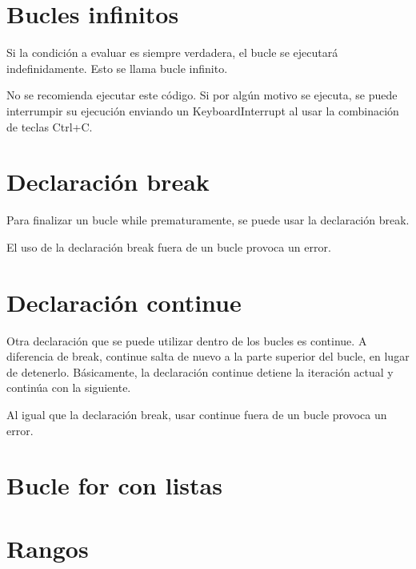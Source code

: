 \documentclass{report}
\begin{document}

\section{Bucles infinitos}

Si la condición a evaluar es siempre verdadera, el bucle se ejecutará indefinidamente. Esto se llama bucle infinito.


No se recomienda ejecutar este código. Si por algún motivo se ejecuta, se puede interrumpir su ejecución enviando un KeyboardInterrupt al usar la combinación de teclas Ctrl+C.

\section{Declaración break}

Para finalizar un bucle while prematuramente, se puede usar la declaración break.


El uso de la declaración break fuera de un bucle provoca un error.


\section{Declaración continue}

Otra declaración que se puede utilizar dentro de los bucles es continue. A diferencia de break, continue salta de nuevo a la parte superior del bucle, en lugar de detenerlo. Básicamente, la declaración continue detiene la iteración actual y continúa con la siguiente.


Al igual que la declaración break, usar continue fuera de un bucle provoca un error.


\section{Bucle for con listas}

\section{Rangos}
\end{document}
